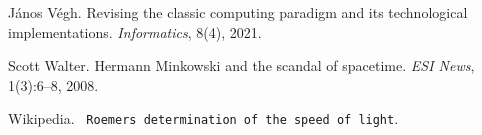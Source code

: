 \begin{DoxyDescription}
\item[\label{citelist_CITEREF_VeghRevisingClassicComputing:2021}%
\mbox{[}61\mbox{]}]J\'{a}nos V\'{e}gh. Revising the classic computing paradigm and its technological implementations. {\itshape Informatics}, 8(4), 2021. 


\item[\label{citelist_CITEREF_Minkowski100:2008}%
\mbox{[}62\mbox{]}]Scott Walter. Hermann Minkowski and the scandal of spacetime. {\itshape ESI News}, 1(3)\+:6--8, 2008.


\item[\label{citelist_CITEREF_Roemer:1676}%
\mbox{[}63\mbox{]}]Wikipedia. {\texttt{ Roemer\textquotesingle{}s determination of the speed of light}}.


\end{DoxyDescription}